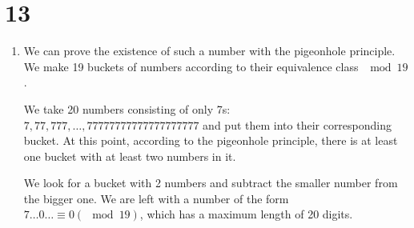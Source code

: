 \documentclass[12pt]{article}
\begin{document}
\section*{13}
\begin{enumerate}[a]
	\item %
	We can prove the existence of such a number with the pigeonhole principle. We make 19 buckets of numbers according to their equivalence class $\mod 19$.

	We take 20 numbers consisting of only 7s: $7, 77, 777, \dots, 77777777777777777777$ and put them into their corresponding bucket. At this point, according to the pigeonhole principle, there is at least one bucket with at least two numbers in it.

	We look for a bucket with 2 numbers and subtract the smaller number from the bigger one. We are left with a number of the form $7 \dots 0 \dots \equiv 0 (\mod 19)$, which has a maximum length of 20 digits.


\end{enumerate}
\end{document}
